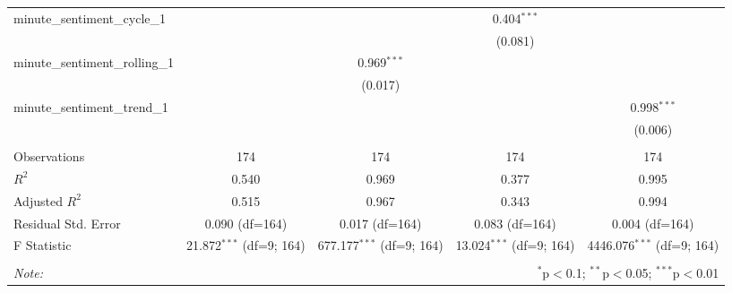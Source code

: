 \documentclass[12pt, letterpaper]{article}
\begin{document}
\begin{table}[H]
\begin{adjustbox}{width=\textwidth}
\begin{tabular}{@{\extracolsep{5pt}}lcccc}
    minute\_sentiment\_cycle\_1 & & & 0.404$^{***}$ & \\
    & & & (0.081) & \\
    minute\_sentiment\_rolling\_1 & & 0.969$^{***}$ & & \\
    & & (0.017) & & \\
    minute\_sentiment\_trend\_1 & & & & 0.998$^{***}$ \\
    & & & & (0.006) \\
    \hline \\[-1.8ex]
    Observations & 174 & 174 & 174 & 174 \\
    $R^2$ & 0.540 & 0.969 & 0.377 & 0.995 \\
    Adjusted $R^2$ & 0.515 & 0.967 & 0.343 & 0.994 \\
    Residual Std. Error & 0.090 (df=164) & 0.017 (df=164) & 0.083 (df=164) & 0.004 (df=164) \\
    F Statistic & 21.872$^{***}$ (df=9; 164) & 677.177$^{***}$ (df=9; 164) & 13.024$^{***}$ (df=9; 164) & 4446.076$^{***}$ (df=9; 164) \\
    \hline
    \hline \\[-1.8ex]
    \textit{Note:} & \multicolumn{4}{r}{$^{*}$p$<$0.1; $^{**}$p$<$0.05; $^{***}$p$<$0.01} \\
    \end{tabular}
    \end{adjustbox}
    \end{table} 


    
\end{document}

